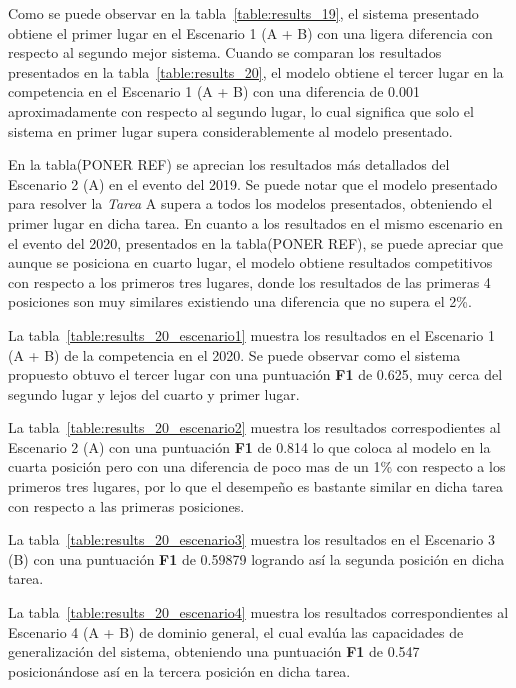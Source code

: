 Como se puede observar en la tabla~\ref{table:results_19}, el sistema presentado obtiene el primer lugar en el Escenario 1 (A + B) con una ligera diferencia con respecto al segundo mejor sistema. Cuando se comparan los resultados presentados en la tabla~\ref{table:results_20}, el modelo obtiene el tercer lugar en la competencia en el Escenario 1 (A + B) con una diferencia de 0.001 aproximadamente con respecto al segundo lugar, lo cual significa que solo el sistema en primer lugar supera considerablemente al modelo presentado.

En la tabla(PONER REF) se aprecian los resultados m\'as detallados del Escenario 2 (A) en el evento del 2019. Se puede notar que el modelo presentado para resolver la \emph{Tarea} A supera a todos los modelos presentados, obteniendo el primer lugar en dicha tarea. En cuanto a los resultados en el mismo escenario en el evento del 2020, presentados en la tabla(PONER REF), se puede apreciar que aunque se posiciona en cuarto lugar, el modelo obtiene resultados competitivos con respecto a los primeros tres lugares, donde los resultados de las primeras 4 posiciones son muy similares existiendo una diferencia que no supera el 2\%.

La tabla~\ref{table:results_20_escenario1} muestra los resultados en el Escenario 1 (A + B) de la competencia en el 2020. Se puede observar como el sistema propuesto obtuvo el tercer lugar con una puntuaci\'on \textbf{F1} de 0.625, muy cerca del segundo lugar y lejos del cuarto y primer lugar. 

La tabla~\ref{table:results_20_escenario2} muestra los resultados correspodientes al Escenario 2 (A) con una puntuaci\'on \textbf{F1} de 0.814 lo que coloca al modelo en la cuarta posici\'on pero con una diferencia de poco mas de un 1\% con respecto a los primeros tres lugares, por lo que el desempe\~no es bastante similar en dicha tarea con respecto a las primeras posiciones.

La tabla~\ref{table:results_20_escenario3} muestra los resultados en el Escenario 3 (B) con una puntuaci\'on \textbf{F1} de 0.59879 logrando as\'i la segunda posici\'on en dicha tarea.

La tabla~\ref{table:results_20_escenario4} muestra los resultados correspondientes al Escenario 4 (A + B) de dominio general, el cual eval\'ua las capacidades de generalizaci\'on del sistema, obteniendo una puntuaci\'on \textbf{F1} de 0.547 posicion\'andose as\'i en la tercera posici\'on en dicha tarea.
%
% 
%

